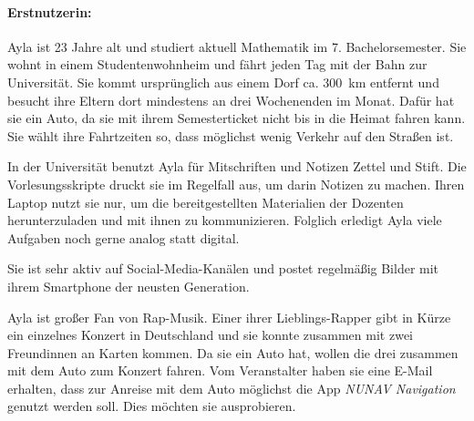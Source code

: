 \paragraph{Erstnutzerin:} Ayla ist 23 Jahre alt und studiert aktuell Mathematik im 7. Bachelorsemester. Sie wohnt in einem Studentenwohnheim und fährt jeden Tag mit der Bahn zur Universität. Sie kommt ursprünglich aus einem Dorf ca. 300~km entfernt und besucht ihre Eltern dort mindestens an drei Wochenenden im Monat. Dafür hat sie ein Auto, da sie mit ihrem Semesterticket nicht bis in die Heimat fahren kann. Sie wählt ihre Fahrtzeiten so, dass möglichst wenig Verkehr auf den Straßen ist.

In der Universität benutzt Ayla für Mitschriften und Notizen Zettel und Stift. Die Vorlesungsskripte druckt sie im Regelfall aus, um darin Notizen zu machen. Ihren Laptop nutzt sie nur, um die bereitgestellten Materialien der Dozenten herunterzuladen und mit ihnen zu kommunizieren. Folglich erledigt Ayla viele Aufgaben noch gerne analog statt digital. 

Sie ist sehr aktiv auf Social-Media-Kanälen und postet regelmäßig Bilder mit ihrem Smartphone der neusten Generation.

Ayla ist großer Fan von Rap-Musik. Einer ihrer Lieblings-Rapper gibt in Kürze ein einzelnes Konzert in Deutschland und sie konnte zusammen mit zwei Freundinnen an Karten kommen. Da sie ein Auto hat, wollen die drei zusammen mit dem Auto zum Konzert fahren. Vom Veranstalter haben sie eine E-Mail erhalten, dass zur Anreise mit dem Auto möglichst die App \textit{NUNAV Navigation} genutzt werden soll. Dies möchten sie ausprobieren.

\newpage

